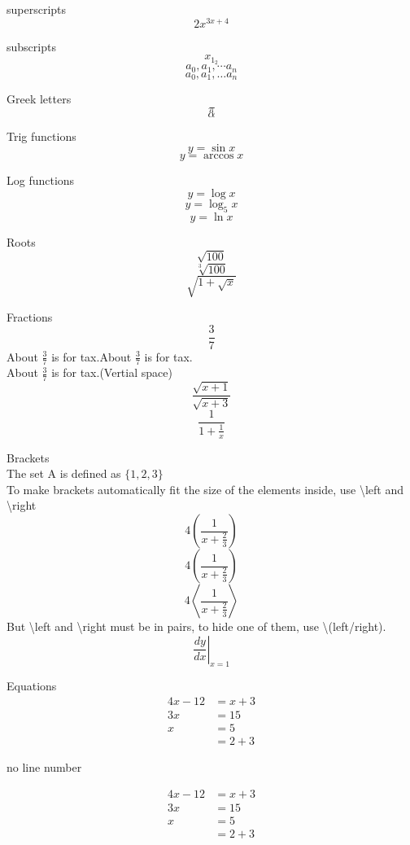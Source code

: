 \documentclass[11pt]{article}
\begin{document}
superscripts
$$2x^{3x+4}$$

subscripts
$$x_{1_2}$$
$$a_0, a_1,\cdots a_n$$
$$a_0, a_1,\ldots a_n$$

Greek letters
$$\pi$$
$$\alpha$$

Trig functions
$$y=\sin x$$
$$y=\arccos x$$

Log functions
$$y=\log x$$
$$y=\log_{5} x$$
$$y=\ln x$$

Roots
$$\sqrt{100}$$
$$\sqrt[3]{100}$$
$$\sqrt{   1+\sqrt{x}   }$$

Fractions
$$\frac{3}{7}$$
About $\displaystyle \frac{3}{7}$ is for tax.About $\frac{3}{7}$ is for tax.\\[6pt]
About $\frac{3}{7}$ is for tax.(Vertial space)
$$\frac{\sqrt{x+1}}{\sqrt{x+3}}$$
$$\frac{1}{   1+\frac{1}{x}   }$$

Brackets\\
The set A is defined as $\{1, 2, 3\}$\\
To make brackets automatically fit the size of the elements inside, use \textbackslash left and \textbackslash right
$$4(\frac{1}{x+\frac{2}{3}})$$
$$4\left(\frac{1}{x+\frac{2}{3}}\right)$$
$$4\left\langle\frac{1}{x+\frac{2}{3}}\right\rangle$$
But \textbackslash left and \textbackslash right must be in pairs, to hide one of them, use \textbackslash (left/right).
$$\left.\frac{dy}{dx}\right|_{x=1}$$

Equations
\begin{align}
4x-12&=x+3\\
3x&=15\\
x&=5\\
&=2+3
\end{align}

no line number

\begin{align*}
4x-12&=x+3\\
3x&=15\\
x&=5\\
&=2+3
\end{align*}
\end{document}

